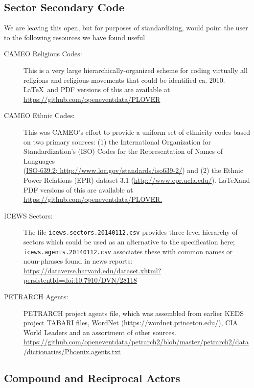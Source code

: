 \documentclass[11pt]{report}
\newcommand{\txt}[1]{\texttt{#1}}
\begin{document}
\subsection{Sector Secondary Code}

We are leaving this open, but for purposes of standardizing, would point the user to the following resources we have found useful

\begin{description}
\item[CAMEO Religious Codes:] This is a very large hierarchically-organized scheme for coding virtually all religions and religious-movements that could be identified ca. 2010. \LaTeX~and PDF versions of this are available at \url{https://github.com/openeventdata/PLOVER}
\item[CAMEO Ethnic Codes:] This was CAMEO's effort to provide a uniform set of ethnicity codes based on  two primary sources: (1) the International Organization for Standardization's (ISO) Codes for the Representation of Names of Languages\\ (\url{ISO-639.2; http://www.loc.gov/standards/iso639-2/}) and (2) the Ethnic Power Relations (EPR) dataset 3.1 (\url{http://www.epr.ucla.edu/}). \LaTeX and PDF versions of this are available at \url{https://github.com/openeventdata/PLOVER.}


\item[ICEWS Sectors:] The file \txt{icews.sectors.20140112.csv} provides three-level hierarchy of sectors which could be used as an alternative to the specification here; \txt{	
icews.agents.20140112.csv} associates these with common names or noun-phrases found in news reports:\\ \url{https://dataverse.harvard.edu/dataset.xhtml?persistentId=doi:10.7910/DVN/28118}

\item[PETRARCH Agents:] PETRARCH project agents file, which was assembled from earlier KEDS project TABARI files, WordNet (\url{https://wordnet.princeton.edu/}), CIA World Leaders and an assortment of other sources.\\ \url{https://github.com/openeventdata/petrarch2/blob/master/petrarch2/data/dictionaries/Phoenix.agents.txt}
\end{description}

\subsection{Compound and Reciprocal Actors}\label{sec:recip}
\end{document}
